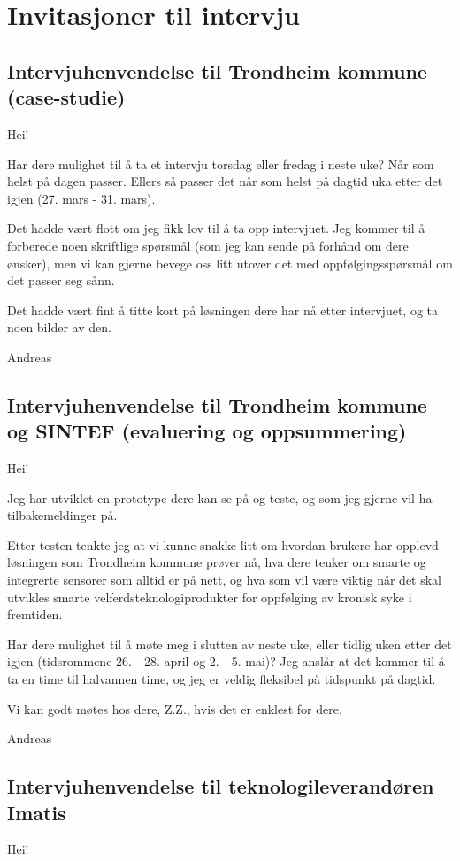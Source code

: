 \chapter{Invitasjoner til intervju}
\label{appendix:invitasjon_evaluering}

\section{Intervjuhenvendelse til Trondheim kommune (case-studie)}
Hei!

Har dere mulighet til å ta et intervju torsdag eller fredag i neste uke? Når som helst på dagen passer. 
Ellers så passer det når som helst på dagtid uka etter det igjen (27. mars - 31. mars).

Det hadde vært flott om jeg fikk lov til å ta opp intervjuet. Jeg kommer til å forberede noen skriftlige spørsmål
(som jeg kan sende på forhånd om dere ønsker),
men vi kan gjerne bevege oss litt utover det med oppfølgingsspørsmål om det passer seg sånn. 

Det hadde vært fint å titte kort på løsningen dere har nå etter intervjuet, og ta noen bilder av den.

Andreas

\section{Intervjuhenvendelse til Trondheim kommune og SINTEF (evaluering og oppsummering)}
Hei! 

Jeg har utviklet en prototype dere kan se på og teste, og som jeg gjerne vil ha tilbakemeldinger på.

Etter testen tenkte jeg at vi kunne snakke litt om hvordan brukere har opplevd løsningen som Trondheim kommune prøver nå, hva dere tenker om smarte
og integrerte sensorer som alltid er på nett, og hva som vil være viktig når det skal utvikles smarte velferdsteknologiprodukter for oppfølging av
kronisk syke i fremtiden.

Har dere mulighet til å møte meg i slutten av neste uke, eller tidlig uken etter det igjen (tidsrommene 26. - 28. april og 2. - 5. mai)? Jeg anslår
at det kommer til å ta en time til halvannen time, og jeg er veldig fleksibel på tidspunkt på dagtid. 

Vi kan godt møtes hos dere, Z.Z., hvis det er enklest for dere.

Andreas

\section{Intervjuhenvendelse til teknologileverandøren Imatis}
Hei! 

